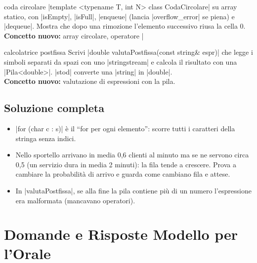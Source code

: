 \begin{step}{coda circolare}
\cc|template <typename T, int N> class CodaCircolare| su array statico, con
\cc|isEmpty|, \cc|isFull|, \cc|enqueue| (lancia \cc|overflow_error| se piena) e
\cc|dequeue|. Mostra che dopo una rimozione l'elemento successivo riusa la cella 0.\\[0.3em]
\textbf{Concetto nuovo:} array circolare, operatore \cc|%
\end{step}

\begin{step}{calcolatrice postfissa}
Scrivi \cc|double valutaPostfissa(const string& espr)| che legge i simboli separati da
spazi con uno \cc|stringstream| e calcola il risultato con una \cc|Pila<double>|.
\cc|stod| converte una \cc|string| in \cc|double|.\\[0.3em]
\textbf{Concetto nuovo:} valutazione di espressioni con la pila.
\end{step}

\subsection*{Soluzione completa}

\begin{consiglio}
\begin{itemize}
  \item \cc|for (char c : s)| è il ``for per ogni elemento'': scorre tutti i caratteri
        della stringa senza indici.
  \item Nello sportello arrivano in media 0,6 clienti al minuto ma se ne servono circa
        0,5 (un servizio dura in media 2 minuti): la fila tende a crescere. Prova a
        cambiare la probabilità di arrivo e guarda come cambiano fila e attese.
  \item In \cc|valutaPostfissa|, se alla fine la pila contiene più di un numero
        l'espressione era malformata (mancavano operatori).
\end{itemize}
\end{consiglio}

\section{Domande e Risposte Modello per l'Orale}

